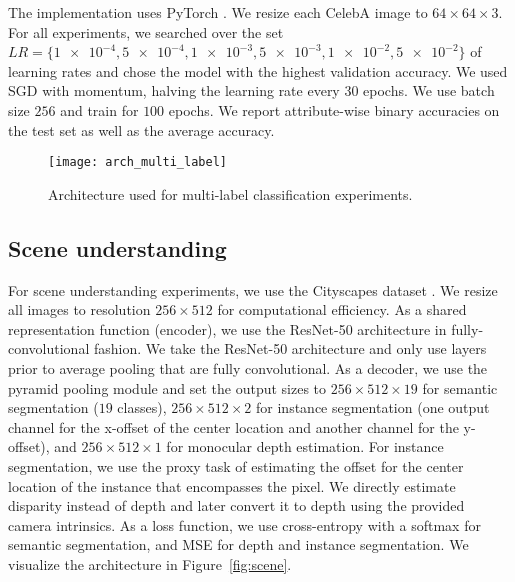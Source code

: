 The implementation uses PyTorch \citep{pytorch}. We resize each CelebA image \citep{celeba} to $64\times64\times3$. For all experiments, we searched over the set $LR=\{\num{1e-4}, \num{5e-4}, \num{1e-3}, \num{5e-3}, \num{1e-2}, \num{5e-2}\}$ of learning rates and chose the model with the highest validation accuracy. We used SGD with momentum, halving the learning rate every 30 epochs. We use batch size $256$ and train for $100$ epochs. We report attribute-wise binary accuracies on the test set as well as the average accuracy.

\begin{figure}[ht]
\texttt{[image: arch\_multi\_label]}
\caption{Architecture used for multi-label classification experiments.}
\label{fig:arch_multi_label}
\end{figure}

\subsection{Scene understanding}
For scene understanding experiments, we use the Cityscapes dataset \citep{cityscapes}. We resize all images to resolution $256\times512$ for computational efficiency. As a shared representation function (encoder), we use the ResNet-50 architecture \citep{resnet} in fully-convolutional fashion. We take the ResNet-50 architecture and only use layers prior to average pooling that are fully convolutional. As a decoder, we use the pyramid pooling module \citep{pspnet} and set the output sizes to $256\times512\times19$ for semantic segmentation ($19$ classes), $256\times512\times2$ for instance segmentation (one output channel for the x-offset of the center location and another channel for the y-offset), and $256\times512\times1$ for monocular depth estimation. For instance segmentation, we use the proxy task of estimating the offset for the center location of the instance that encompasses the pixel. We directly estimate disparity instead of depth and later convert it to depth using the provided camera intrinsics. As a loss function, we use cross-entropy with a softmax for semantic segmentation, and MSE for depth and instance segmentation. We visualize the architecture in Figure~\ref{fig:scene}.

